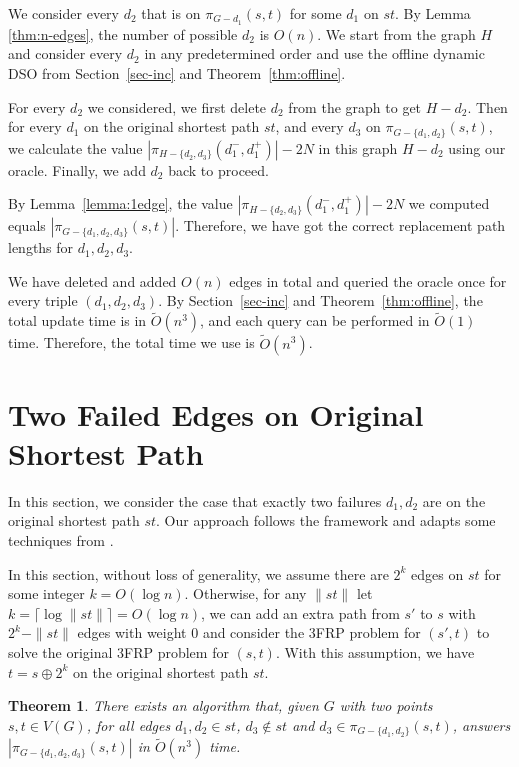 \documentclass[11pt]{article}
\theoremstyle{plain}
\newtheorem{theorem}{Theorem}[section]
\theoremstyle{definition}
\newcommand{\too}[1]{\tilde{O}({#1})}
\newcommand{\set}[1]{\{ #1 \}}
\newcommand{\og}[3]{\pi_{G-#3}\left(#1,#2\right)}
\newcommand{\hg}[3]{\pi_{H-#3}\left(#1,#2\right)}
\begin{document}
We consider every $d_2$ that is on $\og{s}{t}{d_1}$ for some $d_1$ on $st$. By Lemma \ref{thm:n-edges}, the number of possible $d_2$ is $O(n)$. We start from the graph $H$ and consider every $d_2$ in any predetermined order and use the offline dynamic DSO from Section~\ref{sec-inc} and Theorem~\ref{thm:offline}. 

For every $d_2$ we considered, we first delete $d_2$ from the graph to get $H-d_2$. Then for every $d_1$ on the original shortest path $st$, and every $d_3$ on $\og{s}{t}{\set{d_1, d_2}}$, we calculate the value $|\hg{d_1^-}{d_1^+}{\set{d_2, d_3}}|-2N$ in this graph $H-d_2$ using our oracle. Finally, we add $d_2$ back to proceed.

By Lemma~\ref{lemma:1edge}, the value $|\hg{d_1^-}{d_1^+}{\set{d_2, d_3}}|-2N$ we computed equals $|\og{s}{t}{\set{d_1, d_2, d_3}}|$. Therefore, we have got the correct replacement path lengths for ${d_1,d_2,d_3}$.

We have deleted and added $O(n)$ edges in total and queried the oracle once for every triple $(d_1,d_2,d_3)$. By Section~\ref{sec-inc} and Theorem~\ref{thm:offline}, the total update time is in $\too{n^3}$, and each query can be performed in $\tilde{O}(1)$ time. Therefore, the total time we use is $\too{n^3}$. 







 \section{Two Failed Edges on Original Shortest Path}\label{sec:2-edge}

In this section, we consider the case that exactly two failures $d_1,d_2$ are on the original shortest path $st$. Our approach follows the framework and adapts some techniques from \cite{duan2009dual}.

In this section, without loss of generality, we assume there are $2^k$ edges on $st$ for some integer $k=O(\log n)$. Otherwise, for any $\| st \|$ let $k=\lceil \log \| st \| \rceil = O(\log n)$, we can add an extra path from $s'$ to $s$ with $2^k - \| st \|$ edges with weight $0$ and consider the 3FRP problem for $(s',t)$ to solve the original 3FRP problem for $(s,t)$. With this assumption, we have $t=s \oplus 2^k$ on the original shortest path $st$. 


\begin{theorem}
There exists an algorithm that, given $G$ with two points $s,t \in V(G)$, for all edges $d_1,d_2 \in st$, $d_3 \not \in st$ and $d_3 \in \og{s}{t}{\set{d_1, d_2}}$, answers $|\og{s}{t}{\set{d_1, d_2, d_3}}|$ in $\too{n^3}$ time.
\end{theorem}
\end{document}
